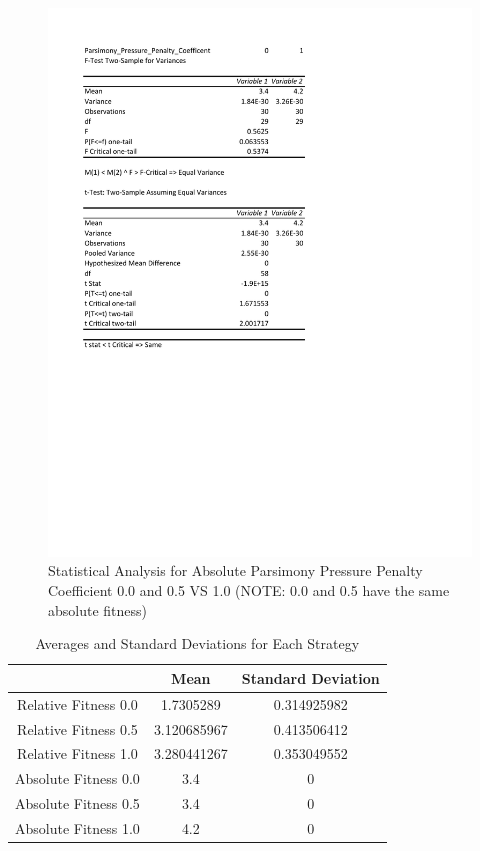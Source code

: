 \documentclass[times]{article}
\begin{document}
	\begin{figure}
		\caption{Statistical Analysis for Absolute Parsimony Pressure Penalty Coefficient 0.0 and 0.5 VS 1.0 (NOTE: 0.0 and 0.5 have the same absolute fitness)}
		\label{fig:stat_abs_012}
		\includegraphics[width=\textwidth]{./pictures/absolute_012.pdf}
	\end{figure}

	\begin{table}
		\centering
		\caption{Averages and Standard Deviations for Each Strategy}
		\label{tab:std_mean}
		\begin{tabular}{| c | c | c |}
			\hline
									& Mean 		& Standard Deviation 	\\
			\hline
			Relative Fitness 0.0	& 1.7305289 & 0.314925982			\\
			\hline
			Relative Fitness 0.5	& 3.120685967 &	0.413506412			\\
			\hline
			Relative Fitness 1.0	& 3.280441267 &	0.353049552			\\
			\hline
			Absolute Fitness 0.0	& 3.4		 & 0					\\
			\hline
			Absolute Fitness 0.5	& 3.4		 & 0					\\
			\hline
			Absolute Fitness 1.0	& 4.2		 & 0					\\
			\hline
		\end{tabular}
	\end{table}
\end{document}
